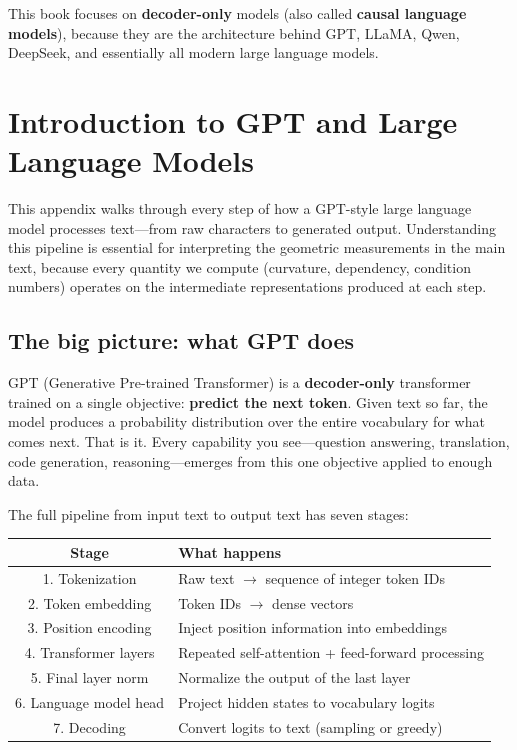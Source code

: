 \documentclass[11pt, twoside, openright]{memoir}
\begin{document}
This book focuses on \textbf{decoder-only} models (also called
\textbf{causal language models}), because they are the architecture behind
GPT, LLaMA, Qwen, DeepSeek, and essentially all modern large language models.


\chapter{Introduction to GPT and Large Language Models}
\label{app:gpt-llm}


This appendix walks through every step of how a GPT-style large language
model processes text---from raw characters to generated output.
Understanding this pipeline is essential for interpreting the geometric
measurements in the main text, because every quantity we compute
(curvature, dependency, condition numbers) operates on the intermediate
representations produced at each step.

\section{The big picture: what GPT does}

GPT (Generative Pre-trained Transformer) is a \textbf{decoder-only}
transformer trained on a single objective: \textbf{predict the next token}.
Given text so far, the model produces a probability distribution over the
entire vocabulary for what comes next.  That is it.  Every capability you
see---question answering, translation, code generation, reasoning---emerges
from this one objective applied to enough data.

The full pipeline from input text to output text has seven stages:

\begin{center}\small
\begin{tabular}{@{}cl@{}}
\toprule
\textbf{Stage} & \textbf{What happens} \\
\midrule
1. Tokenization     & Raw text $\to$ sequence of integer token IDs \\
2. Token embedding  & Token IDs $\to$ dense vectors \\
3. Position encoding & Inject position information into embeddings \\
4. Transformer layers & Repeated self-attention + feed-forward processing \\
5. Final layer norm  & Normalize the output of the last layer \\
6. Language model head & Project hidden states to vocabulary logits \\
7. Decoding          & Convert logits to text (sampling or greedy) \\
\bottomrule
\end{tabular}
\end{center}
\end{document}
